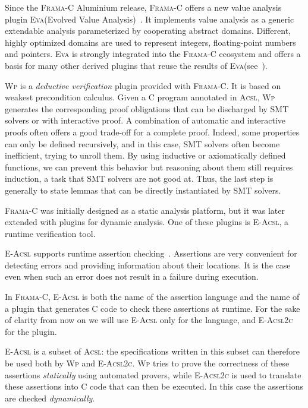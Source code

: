 \documentclass[11pt]{article}
\newcommand{\framac}{\textsc{Frama-C}\xspace}
\newcommand{\acsl}{\textsc{Acsl}\xspace}
\newcommand{\eacsl}{\textsc{E-Acsl}\xspace}
\newcommand{\eacsltoc}{\textsc{E-Acsl2c}\xspace}
\newcommand{\Wp}{\textsc{Wp}\xspace}
\newcommand{\Eva}{\textsc{Eva}\xspace}
\begin{document}
Since the \framac Aluminium release, \framac offers a new value
analysis plugin \Eva (Evolved Value Analysis)~\cite{eva-manual}.  It
implements value analysis as a generic extendable analysis
parameterized by cooperating abstract domains.  Different, highly
optimized domains are used to represent integers, floating-point
numbers and pointers.  \Eva is strongly integrated into the \framac
ecosystem and offers a basis for many other derived plugins that reuse
the results of \Eva (see~\cite{KKP2015:FAC}).

\Wp is a \emph{deductive verification} plugin provided with
\framac. It is based on weakest precondition calculus. Given a C
program annotated in \acsl, \Wp generates the corresponding proof
obligations that can be discharged by SMT solvers or with interactive
proof.  A combination of automatic and interactive proofs often offers
a good trade-off for a complete proof. Indeed, some properties can
only be defined recursively, and in this case, SMT solvers often
become inefficient, trying to unroll them. By using inductive or
axiomatically defined functions, we can prevent this behavior but
reasoning about them still requires induction, a task that SMT solvers
are not good at. Thus, the last step is generally to state lemmas that
can be directly instantiated by SMT solvers.

\framac was initially designed as a static analysis platform, but it
was later extended with plugins for dynamic analysis. One of these
plugins is \eacsl, a runtime verification tool.

\eacsl supports runtime assertion
checking~\cite{CR2006:SEN}. Assertions are very convenient for
detecting errors and providing information about their locations.  It
is the case even when such an error does not result in a failure
during execution. 

In \framac, \eacsl is both the name of the assertion language and the
name of a plugin that generates C code to check these assertions at
runtime. For the sake of clarity from now on we will use \eacsl only
for the language, and \eacsltoc for the plugin.

\eacsl is a subset of \acsl: the specifications written in this subset
can therefore be used both by \Wp and \eacsltoc. \Wp tries to prove
the correctness of these assertions {\em statically} using automated
provers, while \eacsltoc is used to translate these assertions into C
code that can then be executed. In this case the assertions are
checked {\em dynamically}.



\end{document}
